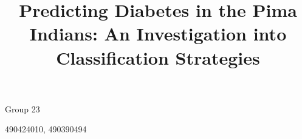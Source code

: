 \documentclass[a4paper, 12pt]{article}
\begin{document}
\title{Predicting Diabetes in the Pima Indians: An Investigation into Classification Strategies}
\maketitle

\begin{center}Group 23\end{center}
\begin{center}490424010, 490390494\end{center}

\tableofcontents
\listoffigures
\listoftables









\end{document}
